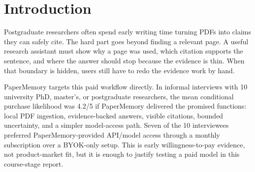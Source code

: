 \begin{abstract}
PDF-based literature work can be slow because researchers need page-level evidence, citation support, and visible uncertainty before they can trust a draft answer. PaperMemory is a local-first compound AI assistant for postgraduate researchers who work with bounded PDF collections. It builds page-level EvidencePackets, combines visual and selectable-text retrieval, runs a bounded evidence-seeking loop, checks reliability, and keeps human verification in the workflow. Early market evidence from informal interviews with 10 PhD, master's, or postgraduate researchers gives a mean conditional purchase likelihood of 4.2/5 if the claimed functions are delivered, and 70\% prefer PaperMemory-provided API/model access through a monthly subscription rather than BYOK-only setup. We therefore evaluate a freemium model with a free BYOK tier and proposed 10 and 20~USD/month tiers that include capped model usage or API relay. On the local synthetic fixture suite, BM25 improves Recall@1 from 77.8\% to 88.9\% and retrieval-level refusal correctness from 33.3\% to 100.0\%; robustness fixtures cover missing evidence, citation drift, prompt-injection-like PDF text, conflicts, and low-text pages. A cost stress test estimates positive base-case net savings for first-pass evidence gathering under stated assumptions, while leaving conversion, retention, hosting cost, support cost, licensing, and real-corpus retrieval quality as open commercialization risks.
\end{abstract}

\section{Introduction}

Postgraduate researchers often spend early writing time turning PDFs into claims they can safely cite. The hard part goes beyond finding a relevant page. A useful research assistant must show why a page was used, which citation supports the sentence, and where the answer should stop because the evidence is thin. When that boundary is hidden, users still have to redo the evidence work by hand.

PaperMemory targets this paid workflow directly. In informal interviews with 10 university PhD, master's, or postgraduate researchers, the mean conditional purchase likelihood was 4.2/5 if PaperMemory delivered the promised functions: local PDF ingestion, evidence-backed answers, visible citations, bounded uncertainty, and a simpler model-access path. Seven of the 10 interviewees preferred PaperMemory-provided API/model access through a monthly subscription over a BYOK-only setup. This is early willingness-to-pay evidence, not product-market fit, but it is enough to justify testing a paid model in this course-stage report.

